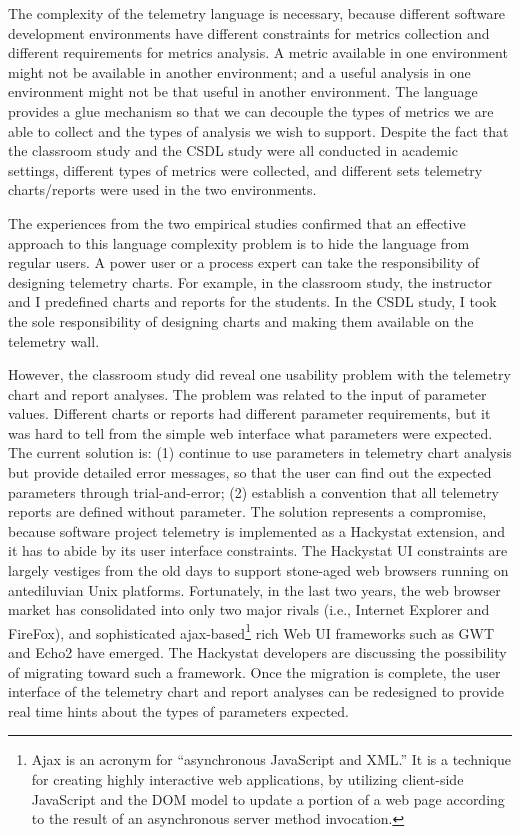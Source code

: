 The complexity of the telemetry language is necessary, because different software development environments have different constraints for metrics collection and different requirements for metrics analysis. A metric available in one environment might not be available in another environment; and a useful analysis in one environment might not be that useful in another environment. The language provides a glue mechanism so that we can decouple the types of metrics we are able to collect and the types of analysis we wish to support.
Despite the fact that the classroom study and the CSDL study were all conducted in academic settings, different types of metrics were collected, and different sets telemetry charts/reports were used in the two environments. 

The experiences from the two empirical studies confirmed that an effective approach to this language complexity problem is to hide the language from regular users. A power user or a process expert can take the responsibility of designing telemetry charts. For example, in the classroom study, the instructor and I predefined charts and reports for the students. In the CSDL study, I took the sole responsibility of designing charts and making them available on the telemetry wall.

However, the classroom study did reveal one usability problem with the telemetry chart and report analyses. The problem was related to the input of parameter values. Different charts or reports had different parameter requirements, but it was hard to tell from the simple web interface what parameters were expected. The current solution is: (1) continue to use parameters in telemetry chart analysis but provide detailed error messages, so that the user can find out the expected parameters through trial-and-error; (2) establish a convention that all telemetry reports are defined without parameter.
The solution represents a compromise, because software project telemetry is implemented as a Hackystat extension, and it has to abide by its user interface constraints. The Hackystat UI constraints are largely vestiges from the old days to support stone-aged web browsers running on antediluvian Unix platforms.
Fortunately, in the last two years, the web browser market has consolidated into only two major rivals (i.e., Internet Explorer and FireFox), and sophisticated ajax-based\footnote{Ajax is an acronym for ``asynchronous JavaScript and XML.'' It is a technique for creating highly interactive web applications, by utilizing client-side JavaScript and the DOM model to update a portion of a web page according to the result of an asynchronous server method invocation.} rich Web UI frameworks such as GWT \cite{Software:GWT} and Echo2 \cite{Software:Echo2} have emerged. The Hackystat developers are discussing the possibility of migrating toward such a framework. Once the migration is complete, the user interface of the telemetry chart and report analyses can be redesigned to provide real time hints about the types of parameters expected. 

